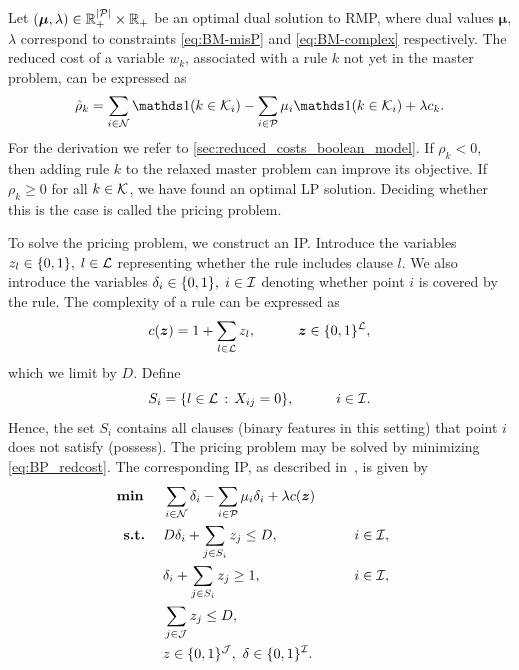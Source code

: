
Let $(\bm{\mu},\lambda) \in \mathbb{R}_+^{\lvert\mathcal{P}\rvert} \times \mathbb{R}_+$ be an optimal dual solution to RMP, where dual values $\bm{\mu}$, $\lambda$ correspond to constraints \eqref{eq:BM-misP} and \eqref{eq:BM-complex} respectively.
The reduced cost of a variable $w_k$, associated with a rule $k$ not yet in the master problem, can be expressed as
\begin{equation}
    \hat \rho_k =  \sum_{i \in \cN} \Ind(k \in \K_i)
    -\sum_{i \in \cP}  \mu_i  \Ind(k \in \K_i) +\lambda  c_k.  \label{eq:BP_redcost}
\end{equation}
For the derivation we refer to \autoref{sec:reduced_costs_boolean_model}.
If $\rho_k < 0$, then adding rule $k$ to the relaxed master problem can improve its objective.
If $\rho_k \geq 0$ for all $k \in \mathcal{K}$, we have found an optimal LP solution.
Deciding whether this is the case is called the pricing problem.

To solve the pricing problem,
we construct an IP.
Introduce the variables $z_l\in\{0,1\}, \; l\in \mathcal{L}$ representing whether the rule includes clause $l$.
We also introduce the variables $\delta_i\in\{0,1\}, \; i\in \mathcal{I}$ denoting whether point $i$ is covered by the rule.
The complexity of a rule can be expressed as
\begin{equation}\label{eq:c_z}
    c(\bm{z}) = 1 + \sum_{l \in \mathcal{L}} z_l, \quad \quad \quad \bm{z} \in \{0,1\}^{\mathcal{L}},
\end{equation}
which we limit by $D$.
Define
\begin{equation}\label{eq:S_i_boolean}
    S_i = \{l \in \mathcal{L} \,:\, X_{ij} = 0\}, \quad \quad \quad i \in \mathcal{I}.
\end{equation}
Hence, the set $S_i$ contains all clauses (binary features in this setting) that point $i$ does not satisfy (possess).
The pricing problem may be solved by minimizing \eqref{eq:BP_redcost}.
The corresponding IP, as described in~\cite{lawless_interpretable_2023}, is given by
\begin{subequations}
    \label{eq:BP}
    \begin{align}
        \text{\textbf{min }} \quad & \sum_{i \in \mathcal{N}} \delta_i - \sum_{i \in \mathcal{P}} \mu_i \delta_i +
        \lambda c(\bm{z}) \label{eq:BP-obj} \\
        \text{\textbf{s.t.}}\; \quad
        & D\delta_i + \sum_{j \in S_i} z_j \leq D, && i \in \mathcal{I}, & \label{eq:BP-upper}\\
        & \delta_i +  \sum_{j \in S_i} z_j \geq  1, && i \in \mathcal{I},  &\label{eq:BP-lower}\\
        & \sum_{j \in \mathcal{J}} z_j \leq D, \quad \label{eq:BP-complex}\\
        & z\in \{0,1\}^{\mathcal{J}},~ \delta\in \{0,1\}^{\mathcal{I}}.\label{eq:BP-int}\qquad
    \end{align}
\end{subequations}

